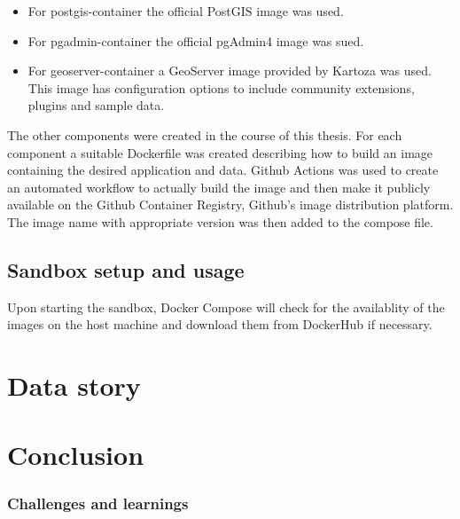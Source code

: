 \documentclass[11pt, a4paper, oneside, parskip=full-]{scrartcl}
\begin{document}
\begin{itemize}
  \item For postgis-container the official PostGIS image was
  used\cite{postgis-container}.
  \item For pgadmin-container the official pgAdmin4 image was
  sued\cite{pgadmin-container}.
  \item For geoserver-container a GeoServer image provided by Kartoza was
  used\cite{geoserver-container}. This image has configuration options to
  include community extensions, plugins and sample data.
\end{itemize}

The other components were created in the course of this thesis. For each
component a suitable Dockerfile was created describing how to build an image
containing the desired application and data. Github Actions\cite{githubactions}
was used to create an automated workflow to actually build the image and then
make it publicly available on the Github Container Registry\cite{gcr}, Github's
image distribution platform. The image name with appropriate version was then
added to the compose file.

\subsection{Sandbox setup and usage}


Upon starting the sandbox, Docker Compose will check for the availablity of the
images on the host machine and download them from DockerHub if necessary.

\section{Data story}


\section{Conclusion}

\subsubsection*{Challenges and learnings}

\printbibliography
\end{document}
